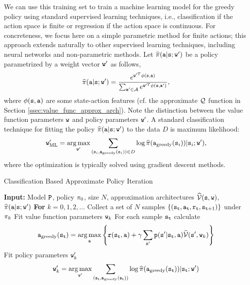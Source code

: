 We can use this training set to train a machine learning model for the greedy policy using standard supervised learning techniques, i.e., classification if the action space is finite or regression if the action space is continuous.
For concreteness, we focus here on a simple parametric method for finite actions; this approach extends naturally to other supervised learning techniques, including neural networks and non-parametric methods.
Let $\widehat{\pi}({\tt a} | {\tt s}; {\tt w}')$ be a policy parametrized by a weight vector ${\tt w}'$ as follows,
\begin{equation*}
    \widehat{\pi}({\tt a} | {\tt s}; {\tt w}') = \frac{e^{{\tt w}'^T \phi({\tt s},{\tt a})}}{\sum_{{\tt a}'\in\mathcal{A}}e^{{\tt w}'^T \phi({\tt s},{\tt a}')}},
\end{equation*}
where $\phi({\tt s},{\tt a})$ are some state-action features (cf. the approximate $\mathcal{Q}$ function in Section \ref{ssec:value_func_approx_arch}).
Note the distinction between the value function parameters ${\tt w}$ and policy parameters ${\tt w}'$. A standard classification technique for fitting the policy $\widehat{\pi}({\tt a} | {\tt s}; {\tt w}')$ to the data $D$ is maximum likelihood:
\begin{equation*}
    \weight'_{\textrm{ML}} = \argmax_{\weight'} \sum_{(\state_i, \action_{\textrm{greedy}}(\state_i)) \in D} \log \widehat{\policy}(\action_{\textrm{greedy}}(\state_i)) | \state_i; \weights'),
\end{equation*}
where the optimization is typically solved using gradient descent methods.

\begin{algorithm}[H]
\caption{Classification Based Approximate Policy Iteration}\label{alg:CB_API}
\begin{algorithmic}[1]
\State \textbf{Input:} Model ${\tt P}$, policy $\pi_0$, size $N$, approximation architectures $\widehat{\mathcal{V}}({\tt s}, {\tt w})$, $\widehat{\pi}({\tt a} | {\tt s}; {\tt w}')$
\State \textbf{For} {$k = 0,1,2,\dots$ }
\State \quad Collect a set of $N$ samples $\{({\tt s}_{\tt t}, {\tt a}_{\tt t}, {\tt r}_{\tt t}, {\tt s}_{{\tt t}+1})\}$ under $\pi_k$
\State \quad \label{line:value_fit}Fit value function parameters ${\tt w}_k$ 
\State \quad \label{line:label_generation}For each sample ${\tt s}_{\tt t}$ calculate
$$\action_{\textrm{greedy}}(\state_\ttime) = \argmax_{\action} \left\{\reward(\state_\ttime,\action) + \discount \sum_{\state'} \transitionprob(\state'|\state_\ttime,\action)\widehat{\Value}(\state', \weights_k)\right\}$$
\State \quad \label{line:policy_fit}Fit policy parameters ${\tt w}'_k$
\begin{equation*}
    \weight'_k = \argmax_{\weight'} \sum_{(\state_\ttime, \action_{\textrm{greedy}}(\state_\ttime))} \log \widehat{\policy}(\action_{\textrm{greedy}}(\state_\ttime)) | \state_\ttime; \weights')
\end{equation*}
\end{algorithmic}
\end{algorithm}

